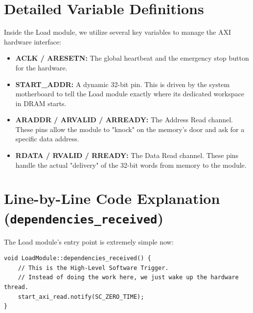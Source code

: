 \documentclass[11pt,a4paper]{report}
\begin{document}
\section{Detailed Variable Definitions}
Inside the Load module, we utilize several key variables to manage the AXI hardware interface:
\begin{itemize}
    \item \textbf{ACLK / ARESETN:} The global heartbeat and the emergency stop button for the hardware.
    \item \textbf{START\_ADDR:} A dynamic 32-bit pin. This is driven by the system motherboard to tell the Load module exactly where its dedicated workspace in DRAM starts.
    \item \textbf{ARADDR / ARVALID / ARREADY:} The Address Read channel. These pins allow the module to "knock" on the memory's door and ask for a specific data address.
    \item \textbf{RDATA / RVALID / RREADY:} The Data Read channel. These pins handle the actual "delivery" of the 32-bit words from memory to the module.
\end{itemize}

\section{Line-by-Line Code Explanation (\texttt{dependencies\_received})}
The Load module's entry point is extremely simple now:
\begin{lstlisting}
void LoadModule::dependencies_received() {
    // This is the High-Level Software Trigger.
    // Instead of doing the work here, we just wake up the hardware thread.
    start_axi_read.notify(SC_ZERO_TIME);
}
\end{lstlisting}
\end{document}

